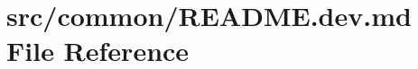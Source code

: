 \hypertarget{common_2README_8dev_8md}{}\section{src/common/\+R\+E\+A\+D\+ME.dev.\+md File Reference}
\label{common_2README_8dev_8md}

